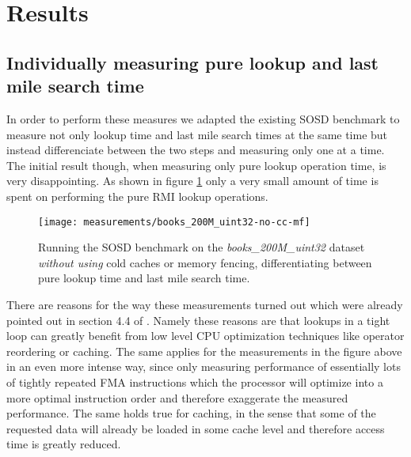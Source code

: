 \section{Results}
\label{sect:experiments:results}

\subsection{Individually measuring pure lookup and last mile search time}
In order to perform these measures we adapted the existing SOSD benchmark to measure not only lookup time and last mile search times at the same time but instead differenciate between the two steps and measuring only one at a time. The initial result though, when measuring only pure lookup operation time, is very disappointing. As shown in figure \ref{fig:books_200M_uint32-no-cc-mf} only a very small amount of time is spent on performing the pure RMI lookup operations.

\captionsetup[figure]{skip=10pt} %
\begin{figure}[!ht]
  \centering
  \texttt{[image: measurements/books\_200M\_uint32-no-cc-mf]}
  \caption[Lookup and last mile search time measures \emph{without using} cold caches and memory fencing]{
    Running the SOSD benchmark on the \emph{books\_200M\_uint32} dataset \emph{without using} cold caches or memory fencing, differentiating between pure lookup time and last mile search time.
  }
  \label{fig:books_200M_uint32-no-cc-mf}
\end{figure}

There are reasons for the way these measurements turned out which were already pointed out in section 4.4 of \cite{sosd-vldb}. Namely these reasons are that lookups in a tight loop can greatly benefit from low level CPU optimization techniques like operator reordering or caching. The same applies for the measurements in the figure above in an even more intense way, since only measuring performance of essentially lots of tightly repeated FMA instructions which the processor will optimize into a more optimal instruction order and therefore exaggerate the measured performance. The same holds true for caching, in the sense that some of the requested data will already be loaded in some cache level and therefore access time is greatly reduced.

